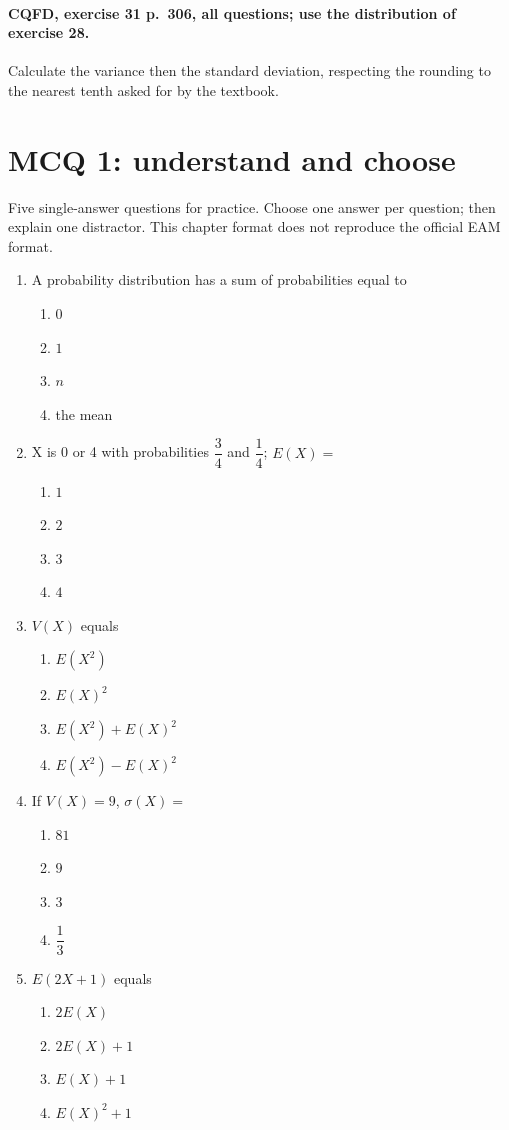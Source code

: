 \paragraph{CQFD, exercise 31 p.~306, all questions; use the distribution of exercise 28.}\label{C08-M2} Calculate the variance then the standard deviation, respecting the rounding to the nearest tenth asked for by the textbook.
\begingroup\small
\clearpage\section*{MCQ 1: understand and choose}\label{C08-Q1}
Five single-answer questions for practice. Choose one answer per question; then explain one distractor. This chapter format does not reproduce the official EAM format.
\begin{enumerate}
\item A probability distribution has a sum of probabilities equal to
\begin{enumerate}[label=\Alph*.,itemsep=2pt]
\item $0$
\item $1$
\item $n$
\item the mean
\end{enumerate}
\item X is 0 or 4 with probabilities $\dfrac{3}{4}$ and $\dfrac{1}{4}$; $E(X)=$
\begin{enumerate}[label=\Alph*.,itemsep=2pt]
\item $1$
\item $2$
\item $3$
\item $4$
\end{enumerate}
\item $V(X)$ equals
\begin{enumerate}[label=\Alph*.,itemsep=2pt]
\item $E(X^2)$
\item $E(X)^2$
\item $E(X^2)+E(X)^2$
\item $E(X^2)-E(X)^2$
\end{enumerate}
\item If $V(X)=9$, $\sigma(X)=$
\begin{enumerate}[label=\Alph*.,itemsep=2pt]
\item $81$
\item $9$
\item $3$
\item $\dfrac{1}{3}$
\end{enumerate}
\item $E(2X+1)$ equals
\begin{enumerate}[label=\Alph*.,itemsep=2pt]
\item $2E(X)$
\item $2E(X)+1$
\item $E(X)+1$
\item $E(X)^2+1$
\end{enumerate}
\end{enumerate}
